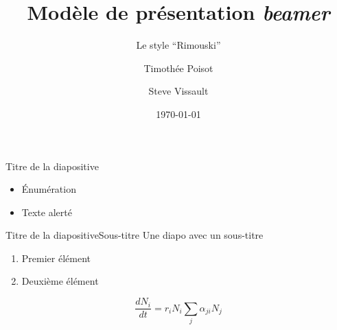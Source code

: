 \documentclass{eecslides}
\title[modèle \emph{beamer}]{Modèle de présentation \emph{beamer}}
\subtitle{Le style ``Rimouski''}
\author{Timothée Poisot \and Steve Vissault}
\institute{UQAR -- \emph{Theoretical Ecosystem Ecology}}
\date{\today} %
\begin{document}
	\frame[plain]{\titlepage}

	\begin{frame}{Titre de la diapositive}
	    
		\begin{itemize}
			\item Énumération
			\item Texte \alert{alerté} 
		\end{itemize}
	
	\end{frame}

	\begin{frame}{Titre de la diapositive}{Sous-titre}
		Une diapo avec un sous-titre

		\begin{enumerate}
			\item Premier élément
			\item Deuxième élément
		\end{enumerate}

		$$\frac{dN_i}{dt} = r_iN_i\sum_j\alpha_{ji}N_j$$

	\end{frame}
\end{document}
